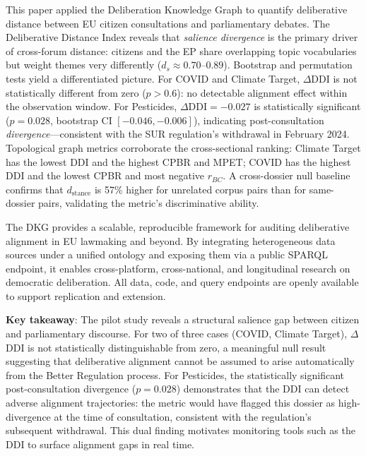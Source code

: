 \documentclass[sigconf,natbib]{acmart}
\begin{document}
This paper applied the Deliberation Knowledge Graph to quantify deliberative distance between EU citizen consultations and parliamentary debates.
The Deliberative Distance Index reveals that \textit{salience divergence} is the primary driver of cross-forum distance: citizens and the EP share overlapping topic vocabularies but weight themes very differently ($d_s \approx 0.70$--$0.89$).
Bootstrap and permutation tests yield a differentiated picture.
For COVID and Climate Target, $\Delta$DDI is not statistically different from zero
($p > 0.6$): no detectable alignment effect within the observation window.
For Pesticides, $\Delta\text{DDI} = -0.027$ is statistically significant ($p = 0.028$,
bootstrap CI $[-0.046, -0.006]$), indicating post-consultation \emph{divergence}---consistent with the SUR regulation's withdrawal in February 2024.
Topological graph metrics corroborate the cross-sectional ranking: Climate Target has the lowest DDI and the highest CPBR and MPET; COVID has the highest DDI and the lowest CPBR and most negative $r_{BC}$.
A cross-dossier null baseline confirms that $d_{\text{stance}}$ is 57\% higher for unrelated corpus pairs than for same-dossier pairs, validating the metric's discriminative ability.

The DKG provides a scalable, reproducible framework for auditing deliberative alignment in EU lawmaking and beyond. By integrating heterogeneous data sources under a unified ontology and exposing them via a public SPARQL endpoint, it enables cross-platform, cross-national, and longitudinal research on democratic deliberation. All data, code, and query endpoints are openly available to support replication and extension.

\textbf{Key takeaway}: The pilot study reveals a structural salience gap between citizen and parliamentary discourse. For two of three cases (COVID, Climate Target), $\Delta$DDI is not statistically distinguishable from zero, a meaningful null result suggesting that deliberative alignment cannot be assumed to arise automatically from the Better Regulation process. For Pesticides, the statistically significant post-consultation divergence ($p=0.028$) demonstrates that the DDI can detect adverse alignment trajectories: the metric would have flagged this dossier as high-divergence at the time of consultation, consistent with the regulation's subsequent withdrawal. This dual finding motivates monitoring tools such as the DDI to surface alignment gaps in real time.
\end{document}
